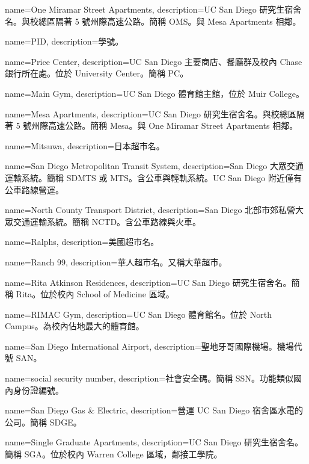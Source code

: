 {
  name={One Miramar Street Apartments},
  description={UC San Diego 研究生宿舍名。與校總區隔著 5 號州際高速公路。簡稱 OMS。與 Mesa Apartments 相鄰。}
}

{
  name={PID},
  description={學號。}
}

{
  name={Price Center},
  description={UC San Diego 主要商店、餐廳群及校內 Chase 銀行所在處。位於 University Center。簡稱 PC。}
}

{
  name={Main Gym},
  description={UC San Diego 體育館主館，位於 Muir College。}
}

{
  name={Mesa Apartments},
  description={UC San Diego 研究生宿舍名。與校總區隔著 5 號州際高速公路。簡稱 Mesa。與 One Miramar Street Apartments 相鄰。}
}

{
  name={Mitsuwa},
  description={日本超市名。}
}

{
  name={San Diego Metropolitan Transit System},
  description={San Diego 大眾交通運輸系統。簡稱 SDMTS 或 MTS。含公車與輕軌系統。UC San Diego 附近僅有公車路線營運。}
}

{
  name={North County Transport District},
  description={San Diego 北部市郊私營大眾交通運輸系統。簡稱 NCTD。含公車路線與火車。}
}

{
  name={Ralphs},
  description={美國超市名。}
}

{
  name={Ranch 99},
  description={華人超市名。又稱大華超市。}
}

{
  name={Rita Atkinson Residences},
  description={UC San Diego 研究生宿舍名。簡稱 Rita。位於校內 School of Medicine 區域。}
}

{
  name={RIMAC Gym},
  description={UC San Diego 體育館名。位於 North Campus。為校內佔地最大的體育館。}
}

{
  name={San Diego International Airport},
  description={聖地牙哥國際機場。機場代號 SAN。}
}

{
  name={social security number},
  description={社會安全碼。簡稱 SSN。功能類似國內身份證編號。}
}

{
  name={San Diego Gas \& Electric},
  description={營運 UC San Diego 宿舍區水電的公司。簡稱 SDGE。}
}

{
  name={Single Graduate Apartments},
  description={UC San Diego 研究生宿舍名。簡稱 SGA。位於校內 Warren College 區域，鄰接工學院。}
}

